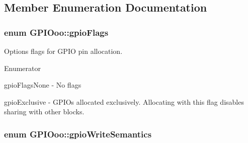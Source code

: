 \subsection{Member Enumeration Documentation}
\hypertarget{class_g_p_i_ooo_a63b72558d40ed7f3ccc0c6f11d1e3b10}{
\subsubsection[{gpio\-Flags}]{\setlength{\rightskip}{0pt plus 5cm}enum {\bf G\-P\-I\-Ooo\-::gpio\-Flags}}}\label{class_g_p_i_ooo_a63b72558d40ed7f3ccc0c6f11d1e3b10}
Options flags for G\-P\-I\-O pin allocation. \begin{Desc}
\item[Enumerator]\par
\begin{description}
\item[{\em 
\hypertarget{class_g_p_i_ooo_a63b72558d40ed7f3ccc0c6f11d1e3b10aa64ecca268265aa77389ee957e01fd63}{gpio\-Flags\-None}\label{class_g_p_i_ooo_a63b72558d40ed7f3ccc0c6f11d1e3b10aa64ecca268265aa77389ee957e01fd63}
}]gpio\-Flags\-None -\/ No flags \item[{\em 
\hypertarget{class_g_p_i_ooo_a63b72558d40ed7f3ccc0c6f11d1e3b10a42607c5a4f579963b6426f81d2266c62}{gpio\-Exclusive}\label{class_g_p_i_ooo_a63b72558d40ed7f3ccc0c6f11d1e3b10a42607c5a4f579963b6426f81d2266c62}
}]gpio\-Exclusive -\/ G\-P\-I\-Os allocated exclusively. Allocating with this flag disables sharing with other blocks. \end{description}
\end{Desc}
\hypertarget{class_g_p_i_ooo_ad4b133662b68989435bcd422feb0fc03}{
\subsubsection[{gpio\-Write\-Semantics}]{\setlength{\rightskip}{0pt plus 5cm}enum {\bf G\-P\-I\-Ooo\-::gpio\-Write\-Semantics}}}\label{class_g_p_i_ooo_ad4b133662b68989435bcd422feb0fc03}
